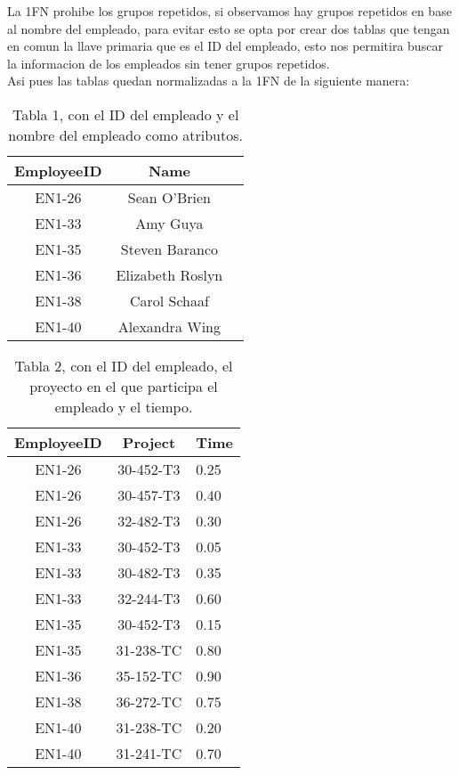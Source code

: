 \documentclass[spanish]{article}
\begin{document}
	
	La 1FN prohibe los grupos repetidos, si observamos hay grupos repetidos en base al nombre del empleado, para evitar esto se opta por crear dos tablas que tengan en comun la llave primaria que es el ID del empleado, esto nos permitira buscar la informacion de los empleados sin tener grupos repetidos.\\
	Asi pues las tablas quedan normalizadas a la 1FN de la siguiente manera:\\
    
    
    
    
    
     \begin{table}[ht]
    \centering
	\begin{tabular}{|c|c|l|}
	\hline
	\textbf{EmployeeID} & \textbf{Name}\\ \hline
	 EN1-26 & Sean O'Brien\\ \hline
	 EN1-33 & Amy Guya\\ \hline
	 EN1-35 & Steven Baranco\\ \hline
	 EN1-36 & Elizabeth Roslyn\\ \hline
	 EN1-38 & Carol Schaaf \\ \hline
	 EN1-40 & Alexandra Wing \\ \hline
	\end{tabular}
	\caption{Tabla 1, con el ID del empleado y el nombre del empleado como atributos.} \label{semi}
	\end{table}
	
	
	
    
    
       
    
     \begin{table}[ht]
    \centering
	\begin{tabular}{|c|c|l|}
	\hline
	\textbf{EmployeeID} & \textbf{Project} & \textbf{Time}\\ \hline
	 EN1-26 & 30-452-T3 & 0.25\\ \hline
	 EN1-26 & 30-457-T3 & 0.40\\ \hline
	 EN1-26 & 32-482-T3 & 0.30\\ \hline
	 EN1-33 & 30-452-T3 & 0.05\\ \hline
	 EN1-33 & 30-482-T3 & 0.35\\ \hline
	 EN1-33 & 32-244-T3 & 0.60\\ \hline
	 EN1-35 & 30-452-T3 & 0.15\\ \hline
	 EN1-35 & 31-238-TC & 0.80\\ \hline
	 EN1-36 & 35-152-TC & 0.90\\ \hline
	 EN1-38 & 36-272-TC & 0.75\\ \hline
	 EN1-40 & 31-238-TC & 0.20\\ \hline
	 EN1-40 & 31-241-TC & 0.70\\ \hline
	\end{tabular}
	\caption{Tabla 2, con el ID del empleado, el proyecto en el que participa el empleado y el tiempo.} \label{semi}
	\end{table}
	
\end{document}
